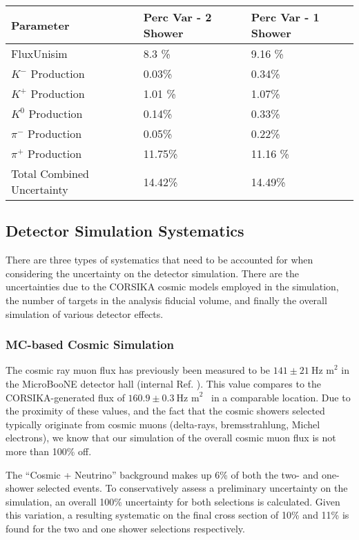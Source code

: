  \begin{table}[H]
 \centering
  \begin{tabular}{| l | l | l |}
  \hline
   Parameter & Perc Var - 2 Shower & Perc Var - 1 Shower  \\ [0.1ex] \hline
 FluxUnisim & 8.3 \% & 9.16 \%  \\
 $K^-$ Production & 0.03\% & 0.34\%\\
 $K^+$ Production &  1.01 \% & 1.07\% \\
 $K^0$ Production & 0.14\% & 0.33\% \\
 $\pi^-$ Production & 0.05\% & 0.22\%\\
 $\pi^+$ Production &  11.75\% & 11.16 \% \\ \hline
 Total Combined Uncertainty & 14.42\% & 14.49\%\\ \hline
\end{tabular}
\end{table}


\clearpage
\subsection{Detector Simulation Systematics}

There are three types of systematics that need to be accounted for when considering the uncertainty on the detector simulation.  There are the uncertainties due to the CORSIKA cosmic models employed in the simulation, the number of targets in the analysis fiducial volume, and finally the overall simulation of various detector effects. 

\subsubsection{MC-based Cosmic Simulation}\label{sec:cosuncert}
 The cosmic ray muon flux has previously been measured to be $141\pm21~\text{Hz~m}^2$ in the MicroBooNE detector hall (internal Ref. \cite{datacosflux}).  This value compares to the CORSIKA-generated flux of $160.9\pm0.3~\text{Hz~m}^2$~\cite{mccosflux} in a comparable location.  Due to the proximity of these values, and the fact that the cosmic showers selected typically originate from cosmic muons (delta-rays, bremsstrahlung, Michel electrons), we know that our simulation of the overall cosmic muon flux is not more than 100\% off.
\par The ``Cosmic + Neutrino'' background makes up 6\% of both the two- and one-shower selected events. To conservatively assess a preliminary uncertainty on the simulation, an overall 100\% uncertainty for both selections is calculated. Given this variation, a resulting systematic on the final cross section of 10\% and 11\% is found for the two and one shower selections respectively. 
 
